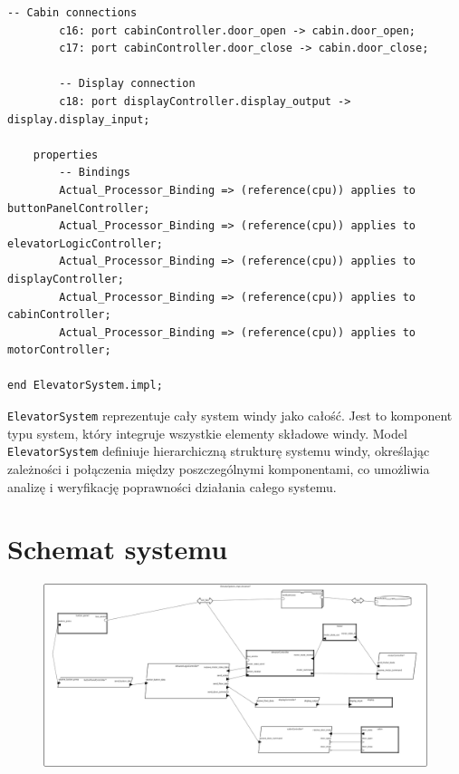 \documentclass{article}
\begin{document}
\begin{lstlisting}[basicstyle=\ttfamily, keywordstyle=\bfseries]
        -- Cabin connections
        c16: port cabinController.door_open -> cabin.door_open;
        c17: port cabinController.door_close -> cabin.door_close;
    
        -- Display connection
        c18: port displayController.display_output -> display.display_input;
        
    properties
        -- Bindings
        Actual_Processor_Binding => (reference(cpu)) applies to buttonPanelController;
        Actual_Processor_Binding => (reference(cpu)) applies to elevatorLogicController;
        Actual_Processor_Binding => (reference(cpu)) applies to displayController;
        Actual_Processor_Binding => (reference(cpu)) applies to cabinController;
        Actual_Processor_Binding => (reference(cpu)) applies to motorController;
        
end ElevatorSystem.impl;
    \end{lstlisting}

    \texttt{ElevatorSystem} reprezentuje cały system windy jako całość. Jest to komponent typu system, który integruje wszystkie elementy składowe windy. Model \texttt{ElevatorSystem} definiuje hierarchiczną strukturę systemu windy, określając zależności i połączenia między poszczególnymi komponentami, co umożliwia analizę i weryfikację poprawności działania całego systemu.



\section{Schemat systemu}


\begin{figure}[H]
    \centering
    \includegraphics[width=1.2\linewidth]{./images/schema.png}
\end{figure}
\end{document}
